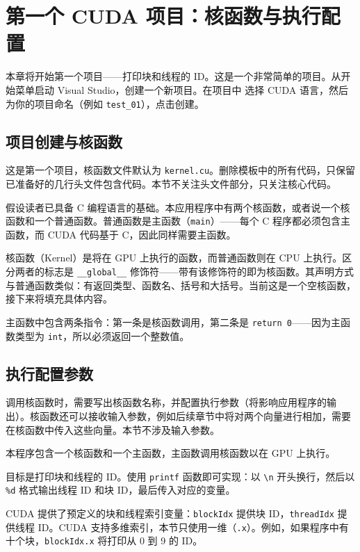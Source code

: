 \section{第一个 CUDA 项目：核函数与执行配置}

本章将开始第一个项目——打印块和线程的 ID。这是一个非常简单的项目。从开始菜单启动 Visual Studio，创建一个新项目。在项目中
选择 CUDA 语言，然后为你的项目命名（例如 \texttt{test\_01}），点击创建。

\subsection{项目创建与核函数}

这是第一个项目，核函数文件默认为 \texttt{kernel.cu}。删除模板中的所有代码，只保留已准备好的几行头文件包含代码。本节不关注头文件部分，只关注核心代码。

假设读者已具备 C 编程语言的基础。本应用程序中有两个核函数，或者说一个核函数和一个普通函数。普通函数是主函数（\texttt{main}）——每个 C 程序都必须包含主函数，而 CUDA 代码基于 C，因此同样需要主函数。

核函数（Kernel）是将在 GPU 上执行的函数，而普通函数则在 CPU 上执行。区分两者的标志是 \texttt{\_\_global\_\_} 修饰符——带有该修饰符的即为核函数。其声明方式与普通函数类似：有返回类型、函数名、括号和大括号。当前这是一个空核函数，接下来将填充具体内容。

主函数中包含两条指令：第一条是核函数调用，第二条是 \texttt{return 0}——因为主函数类型为 \texttt{int}，所以必须返回一个整数值。

\subsection{执行配置参数}

调用核函数时，需要写出核函数名称，并配置执行参数（将影响应用程序的输出）。核函数还可以接收输入参数，例如后续章节中将对两个向量进行相加，需要在核函数中传入这些向量。本节不涉及输入参数。

本程序包含一个核函数和一个主函数，主函数调用核函数以在 GPU 上执行。

目标是打印块和线程的 ID。使用 \texttt{printf} 函数即可实现：以 \texttt{\textbackslash n} 开头换行，然后以 \texttt{\%d} 格式输出线程 ID 和块 ID，最后传入对应的变量。

CUDA 提供了预定义的块和线程索引变量：\texttt{blockIdx} 提供块 ID，\texttt{threadIdx} 提供线程 ID。CUDA 支持多维索引，本节只使用一维（\texttt{.x}）。例如，如果程序中有十个块，\texttt{blockIdx.x} 将打印从 0 到 9 的 ID。

